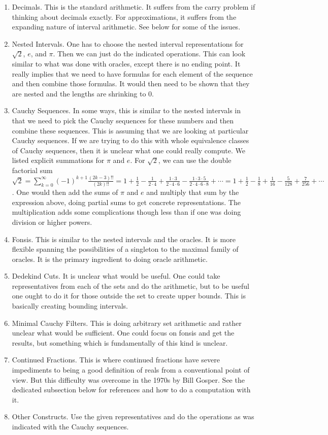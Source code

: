 \documentclass[12pt]{article}
\begin{document}
\begin{enumerate}
\item Decimals. This is the standard arithmetic. It suffers from the carry problem if thinking about decimals exactly. For approximations, it suffers from the expanding nature of interval arithmetic. See below for some of the issues. 
\item Nested Intervals. One has to choose the nested interval representations for $\sqrt{2}$, $e$, and $\pi$. Then we can just do the indicated operations. This can look similar to what was done with oracles, except there is no ending point. It really implies that we need to have formulas for each element of the sequence and then combine those formulas. It would then need to be shown that they are nested and the lengths are shrinking to 0. 
\item Cauchy Sequences. In some ways, this is similar to the nested intervals in that we need to pick the Cauchy sequences for these numbers and then combine these sequences. This is assuming that we are looking at particular Cauchy sequences. If we are trying to do this with whole equivalence classes of Cauchy sequences, then it is unclear what one could really compute. We listed explicit summations for $\pi$ and $e$. For $\sqrt{2}$, we can use the double factorial sum $\sqrt{2} = \sum_{k=0}^\infty (-1)^{k+1} \frac{(2k-3)!!}{(2k)!!} =
1 + \frac{1}{2} - \frac{1}{2\cdot4} + \frac{1\cdot3}{2\cdot4\cdot6} - \frac{1\cdot3\cdot5}{2\cdot4\cdot6\cdot8} + \cdots = 1 + \frac{1}{2} - \frac{1}{8} + \frac{1}{16} - \frac{5}{128} + \frac{7}{256} + \cdots$. One would then add the sums of $\pi$ and $e$ and multiply that sum by the expression above, doing partial sums to get concrete representations. The multiplication adds some complications though less than if one was doing division or higher powers. 
\item Fonsis. This is similar to the nested intervals and the oracles. It is more flexible spanning the possibilities of a singleton to the maximal family of oracles. It is the primary ingredient to doing oracle arithmetic. 
\item Dedekind Cuts. It is unclear what would be useful. One could take representatives from each of the sets and do the arithmetic, but to be useful one ought to do it for those outside the set to create upper bounds. This is basically creating bounding intervals. 
\item Minimal Cauchy Filters. This is doing arbitrary set arithmetic and rather unclear what would be sufficient. One could focus on fonsis and get the results, but something which is fundamentally of this kind is unclear. 
\item Continued Fractions. This is where continued fractions have severe impediments to being a good definition of reals from a conventional point of view. But this difficulty was overcome in the 1970s by Bill Gosper. See the dedicated subsection below for references and how to do a computation with it. 
\item Other Constructs. Use the given representatives and do the operations as was indicated with the Cauchy sequences. 
\end{enumerate}
\end{document}
